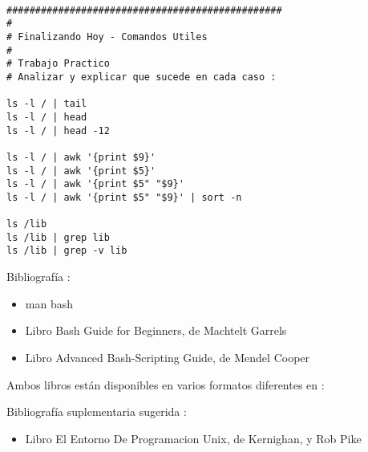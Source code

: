 \documentclass{beamer}
\begin{document}
\begin{Verbatim}

################################################
#
# Finalizando Hoy - Comandos Utiles
#
# Trabajo Practico 
# Analizar y explicar que sucede en cada caso :

ls -l / | tail 
ls -l / | head 
ls -l / | head -12

ls -l / | awk '{print $9}'
ls -l / | awk '{print $5}'
ls -l / | awk '{print $5" "$9}'
ls -l / | awk '{print $5" "$9}' | sort -n

ls /lib
ls /lib | grep lib
ls /lib | grep -v lib
\end{Verbatim}




\begin{frame}
Bibliografía : 
\begin{itemize}
\item man bash
\item Libro Bash Guide for Beginners, de Machtelt Garrels 
\item Libro Advanced Bash-Scripting Guide, de Mendel Cooper
\end{itemize}

Ambos libros están disponibles en varios formatos diferentes en :

Bibliografía suplementaria sugerida : 
\begin{itemize}
\item Libro El Entorno De Programacion Unix, de Kernighan, y Rob Pike
\end{itemize}

\end{frame}
\end{document}
